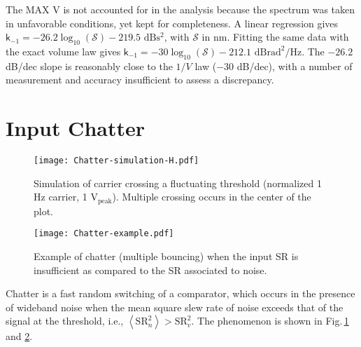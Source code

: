 \documentclass{article}
\newcommand{\unit}[1]{\ensuremath{\mathrm{#1}}}
\begin{document}
The MAX V is not accounted for in the analysis because the spectrum was taken in unfavorable conditions, yet kept for completeness.
A linear regression gives $\mathsf{k}_{-1}=-26.2 \log_{10}(\mathcal{S}) -219.5$ \unit{dBs^2}, with $\mathcal{S}$ in nm.
Fitting the same data with the exact volume law gives $\mathsf{k}_{-1}=-30 \log_{10}(\mathcal{S})-212.1$ \unit{dBrad^2/Hz}.
The $-26.2$ dB/dec slope is reasonably close to the $1/V$ law ($-30$ dB/dec), with a number of measurement and accuracy insufficient to assess a discrepancy. 




\section{Input Chatter}\label{sec:Chatter}
\begin{figure}
\centering
\texttt{[image: Chatter-simulation-H.pdf]}
\caption{Simulation of carrier crossing a fluctuating threshold (normalized 1 Hz carrier, 1 \unit{V_\text{peak}}).  Multiple crossing occurs in the center of the plot.}
\label{fig:Chatter-simulation}
\end{figure}
\begin{figure}
\centering
\texttt{[image: Chatter-example.pdf]}
\caption{Example of chatter (multiple bouncing) when the input SR is insufficient as compared to the SR associated to noise.}
\label{fig:Chatter-example}
\end{figure}
Chatter is a fast random switching of a comparator, which occurs in the presence of wideband noise when the mean square slew rate of noise exceeds that of the signal at the threshold, i.e., $\left<\mathrm{SR}_n^2\right>>\mathrm{SR}_v^2$.  The phenomenon is shown in Fig.\,\ref{fig:Chatter-simulation} and \ref{fig:Chatter-example}.  
\end{document}
